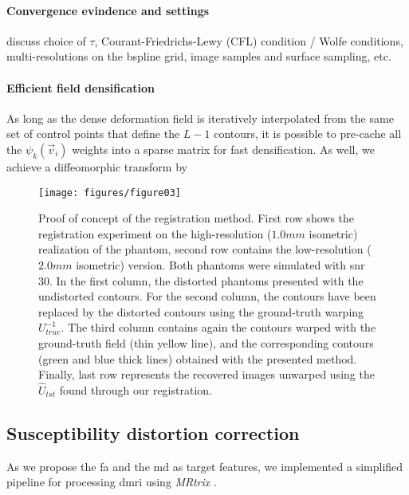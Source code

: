 {\color{red}
\paragraph*{Convergence evindence and settings}
 discuss choice of $\tau$, Courant-Friedrichs-Lewy (CFL) condition / Wolfe conditions, multi-resolutions on the bspline grid, image samples and surface sampling,  etc.
\paragraph*{Efficient field densification}
As long as the dense deformation field is iteratively interpolated
from the same set of control points that define the $L-1$ contours,
it is possible to pre-cache all the $\psi_k(\vec{v}_i)$ weights into a
sparse matrix for fast densification. As well, we achieve a
diffeomorphic transform by}





\begin{figure*}
\texttt{[image: figures/figure03]}
\caption{Proof of concept of the registration method. First row shows the registration experiment
  on the high-resolution ($1.0mm$ isometric) realization of the phantom, second row contains the
  low-resolution ($2.0mm$ isometric) version.
  Both phantoms were simulated with \gls*{snr} 30.
  In the first column, the distorted phantoms presented with the undistorted contours.
  For the second column, the contours have been replaced by the distorted contours using
    the ground-truth warping $U^{-1}_{true}$.
  The third column contains again the contours warped with the ground-truth field
  (thin yellow line), and the corresponding contours (green and blue thick lines)
  obtained with the presented method.
  Finally, last row represents the recovered images unwarped using the $\hat{U}_{tst}$
    found through our registration.
  }\label{fig:results_phantom}
\end{figure*}

\subsection*{Susceptibility distortion correction}
\label{sec:results_hcp}

As we propose the \gls*{fa} and the \gls*{md} as target features, we
  implemented a simplified pipeline for processing \gls*{dmri} using
  \emph{MRtrix} \citep{tournier_mrtrix_2012}.

